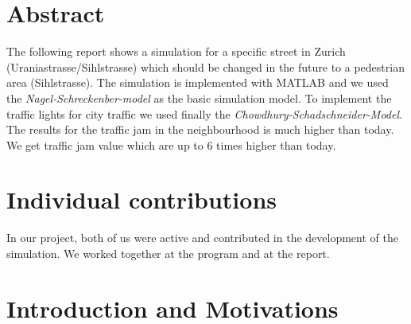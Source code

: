 \documentclass[11pt]{article}
\begin{document}
\section{Abstract}

The following report shows a simulation for a specific street in Zurich (Uraniastrasse/Sihlstrasse) which should be changed in the future to a pedestrian area (Sihlstrasse). The simulation is implemented with MATLAB and we used the \textit{Nagel-Schreckenber-model} as the basic simulation model. To implement the traffic lights for city traffic we used finally the  \textit{Chowdhury-Schadschneider-Model}. The results for the traffic jam in the neighbourhood is much higher than today. We get traffic jam value which are up to 6 times higher than today.

\section{Individual contributions}

In our project, both of us were active and contributed in the development of the simulation. We worked together at the program and at the report.

\section{Introduction and Motivations}
\end{document}
